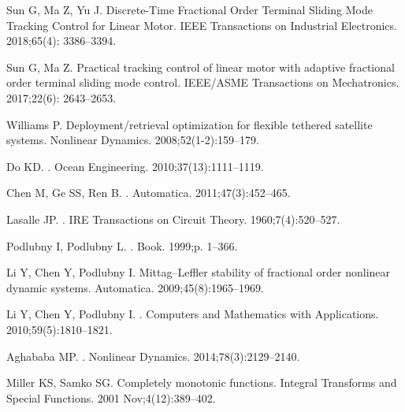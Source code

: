 \documentclass[ShortAfour]{sage}
\theoremstyle{plain}
\theoremstyle{remark}
\begin{document}
\begin{thebibliography}{10}
      Sun G, Ma Z, Yu J.
      \newblock Discrete-Time Fractional Order Terminal Sliding Mode Tracking Control for Linear Motor.
      \newblock IEEE Transactions on Industrial Electronics.
        2018;65(4): 3386--3394.

        Sun G, Ma Z.
        \newblock Practical tracking control of linear motor with adaptive fractional order terminal sliding mode control.
        \newblock IEEE/ASME Transactions on Mechatronics.
          2017;22(6): 2643--2653.
  
  Williams P.
  \newblock Deployment/retrieval optimization for flexible tethered satellite
    systems.
  \newblock Nonlinear Dynamics. 2008;52(1-2):159--179.
  
  Do KD.
  .
  \newblock Ocean Engineering. 2010;37(13):1111--1119.
  
  Chen M, Ge SS, Ren B.
  .
  \newblock Automatica. 2011;47(3):452--465.
  
  Lasalle JP.
  .
  \newblock IRE Transactions on Circuit Theory. 1960;7(4):520--527.
  
  Podlubny I, Podlubny L.
  .
  \newblock Book. 1999;p. 1--366.
  
  Li Y, Chen Y, Podlubny I.
  \newblock Mittag–Leffler stability of fractional order nonlinear dynamic
    systems.
  \newblock Automatica. 2009;45(8):1965--1969.
  
  Li Y, Chen Y, Podlubny I.
  .
  \newblock Computers and Mathematics with Applications. 2010;59(5):1810--1821.
  
  Aghababa MP.
  .
  \newblock Nonlinear Dynamics. 2014;78(3):2129--2140.
  
  Miller KS, Samko SG.
  \newblock Completely monotonic functions.
  \newblock Integral Transforms and Special Functions. 2001 Nov;4(12):389--402.
  
  \end{thebibliography}
  
\end{document}
